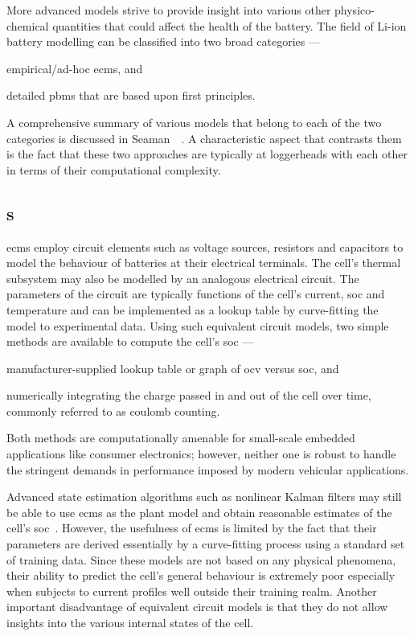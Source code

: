 More   advanced  models   strive   to  provide   insight   into  various   other
physico-chemical quantities  that could  affect the health  of the  battery. The
field of  Li-ion battery modelling can  be classified into two  broad categories
---
\begin{enumerate*}[label=\roman*)]
    \item empirical/ad-hoc \glspl{ecm}, and
    \item detailed  \glspl{pbm} that are based  upon first principles.
\end{enumerate*}
A  comprehensive summary  of  various models  that  belong to  each  of the  two
categories  is  discussed  in Seaman~\etal~\cite{Seaman2014}.  A  characteristic
aspect that contrasts  them is the fact that these  two approaches are typically
at loggerheads with each other in terms of their computational complexity.

\subsection{s}\label{subsec:ecms}

\glspl{ecm}  employ circuit  elements  such as  voltage  sources, resistors  and
capacitors to  model the behaviour  of batteries at their  electrical terminals.
The cell's  thermal subsystem may  also be  modelled by an  analogous electrical
circuit. The  parameters of the  circuit are  typically functions of  the cell's
current, \gls{soc} and  temperature and can be implemented as  a lookup table by
curve-fitting  the model  to experimental  data. Using  such equivalent  circuit
models, two simple methods are available to compute the cell's \gls{soc} ---
\begin{enumerate*}[label=\itshape\alph*\upshape)]
    \item manufacturer-supplied  lookup table or graph of \gls{ocv} versus \gls{soc}, and
    \item numerically integrating the charge passed in and out of the cell over time, commonly referred to as coulomb counting.
\end{enumerate*}
Both methods are computationally  amenable for small-scale embedded applications
like  consumer  electronics;  however,  neither  one is  robust  to  handle  the
stringent demands in performance imposed  by modern vehicular applications.

Advanced state estimation algorithms such  as nonlinear Kalman filters may still
be able to use \glspl{ecm} as the plant model and obtain reasonable estimates of
the  cell's  \gls{soc}~\cite{Plett2006,  Sun2011}. However,  the  usefulness  of
\glspl{ecm} is limited by the fact that their parameters are derived essentially
by a  curve-fitting process using a  standard set of training  data. Since these
models are  not based on  any physical phenomena,  their ability to  predict the
cell's general behaviour  is extremely poor especially when  subjects to current
profiles well  outside their training  realm. Another important  disadvantage of
equivalent circuit  models is that they  do not allow insights  into the various
internal states of the cell.

